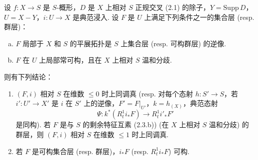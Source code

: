 \begin{theorem}\label{thm:XIII.2.4}
设 $f \colon X \to S$ 是 $S$-概形，$D$ 是 $X$ 上相对 $S$ 正规交叉 (2.1) 的除子，$Y = \mathrm{Supp}\, D$，$U = X - Y$，$i \colon U \to X$ 是典范浸入. 设 $F$ 是 $U$ 上满足下列条件之一的集合层 (resp. 群层)：
\begin{enumerate}[a)]
\item $F$ 局部于 $X$ 和 $S$ 的平展拓扑是 $S$ 上集合层 (resp. 可构群层) 的逆像.
\item $F$ 在 $U$ 上局部常可构，且在 $X$ 上相对 $S$ 温和分歧.
\end{enumerate}
则有下列结论：
\begin{enumerate}[1)]
\item $(F, i)$ 相对 $S$ 在维数 $\leqslant 0$ 时上同调真 (resp. 对每个态射 $h \colon S' \to S$，若 $i' \colon U' \to X'$ 是 $i$ 在 $S'$ 上的逆像，$F' = F|_{U'}$，$k = h_{(X)}$，典范态射
\[
\Psi \colon k^{*}(R^1_t i_* F) \longrightarrow R^1_t i'_* F'
\]
是同构).
若 $F$ 是与 $S$ 的剩余特征互素 (2.3.b)) (在 $X$ 上相对 $S$ 温和分歧) 的群层，则 $(F, i)$ 相对 $S$ 在维数 $\leqslant 1$ 时上同调真.
\item 若 $F$ 是可构集合层 (resp. 群层)，$i_* F$ (resp. $R^1_t i_* F$) 可构.
\end{enumerate}
\end{theorem}

